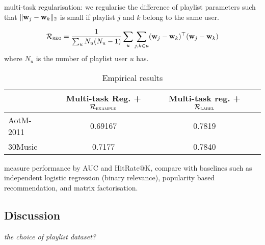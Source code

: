 multi-task regularisation: we regularise the difference of playlist parameters 
such that $\|\mathbf{w}_j - \mathbf{w}_k\|_2$ is small if playlist $j$ and $k$ belong to the same user.

\begin{equation*}
\mathcal{R}_\textsc{reg} = \frac{1}{\sum_u N_u (N_u - 1)} \sum_u \sum_{j, k \in u} (\mathbf{w}_j - \mathbf{w}_k)^\top (\mathbf{w}_j - \mathbf{w}_k)
\end{equation*}
where $N_u$ is the number of playlist user $u$ has.

\begin{table}[!h]
\centering
\caption{Empirical results}
\begin{tabular}{l|ccc}
\toprule
{}            & Multi-task Reg. + $\mathcal{R}_\textsc{example}$ & Multi-task reg. + $\mathcal{R}_\textsc{label}$ \\
\midrule
AotM-2011     & 0.69167 & 0.7819 \\
30Music       & 0.7177  & 0.7840 \\
\bottomrule
\end{tabular}
\end{table}



\TODO
measure performance by AUC and HitRate@K,
compare with baselines such as independent logistic regression (\ie binary relevance), popularity based recommendation,
and matrix factorisation.



\subsection{Discussion}

{\it the choice of playlist dataset?}
